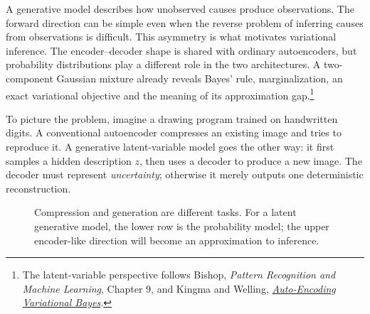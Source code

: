 
A generative model describes how unobserved causes produce observations. The forward direction can be simple even when the reverse problem of inferring causes from observations is difficult. This asymmetry is what motivates variational inference. The encoder--decoder shape is shared with ordinary autoencoders, but probability distributions play a different role in the two architectures. A two-component Gaussian mixture already reveals Bayes' rule, marginalization, an exact variational objective and the meaning of its approximation gap.\footnote{The latent-variable perspective follows Bishop, \emph{Pattern Recognition and Machine Learning}, Chapter 9, and Kingma and Welling, \href{https://arxiv.org/abs/1312.6114}{\emph{Auto-Encoding Variational Bayes}}.}


To picture the problem, imagine a drawing program trained on handwritten digits. A conventional autoencoder compresses an existing image and tries to reproduce it. A generative latent-variable model goes the other way: it first samples a hidden description \(z\), then uses a decoder to produce a new image. The decoder must represent \emph{uncertainty}; otherwise it merely outputs one deterministic reconstruction.

\begin{figure}[H]
\centering
{}
\caption{Compression and generation are different tasks. For a latent generative model, the lower row is the probability model; the upper encoder-like direction will become an approximation to inference.}
\end{figure}

